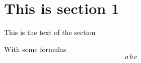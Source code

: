 \documentclass[a4paper]{article}
\begin{document}
\section{This is section 1}
This is the text of the section

With some formulas
$$ a\,b\,c $$

%
\end{document}
